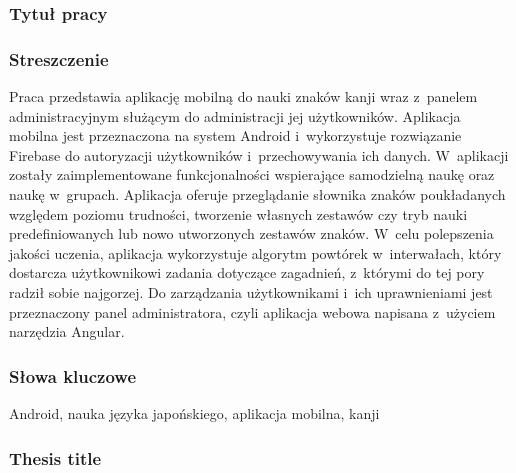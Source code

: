 \documentclass[a4paper,twoside,12pt]{book}
\newcommand{\ksremark}[1]{%
{%
{\color{brickred}{[#1]}}}%
\addcontentsline{rks}{uwagas}{\protect{#1}}%
}
\begin{document}


\cleardoublepage

\rmfamily\normalfont
\pagestyle{empty}



\subsubsection*{Tytuł pracy} 
\Title

\subsubsection*{Streszczenie}  

Praca przedstawia aplikację mobilną do nauki znaków kanji wraz z~panelem administracyjnym służącym do administracji jej użytkowników. Aplikacja mobilna jest przeznaczona na system Android i~wykorzystuje rozwiązanie Firebase do autoryzacji użytkowników i~przechowywania ich danych. W~aplikacji zostały zaimplementowane funkcjonalności wspierające samodzielną naukę oraz naukę w~grupach. Aplikacja oferuje przeglądanie słownika znaków poukładanych względem poziomu trudności, tworzenie własnych zestawów czy tryb nauki predefiniowanych lub nowo utworzonych zestawów znaków. W~celu polepszenia jakości uczenia, aplikacja wykorzystuje algorytm powtórek w~interwałach, który dostarcza użytkownikowi zadania dotyczące zagadnień, z~którymi do tej pory radził sobie najgorzej. Do zarządzania użytkownikami i~ich uprawnieniami jest przeznaczony panel administratora, czyli aplikacja webowa napisana z~użyciem narzędzia Angular. 

\subsubsection*{Słowa kluczowe} 
Android, nauka języka japońskiego, aplikacja mobilna, kanji

\subsubsection*{Thesis title} 
\begin{otherlanguage}{british}
\TitleAlt
\end{otherlanguage}
\end{document}
